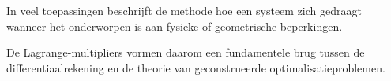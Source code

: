 \documentclass[11pt,a4paper]{article}
\begin{document}
    In veel toepassingen beschrijft de methode hoe een systeem
    zich gedraagt wanneer het onderworpen is aan fysieke of
    geometrische beperkingen.

    De Lagrange-multipliers vormen daarom een fundamentele brug
    tussen de differentiaalrekening en de theorie van
    geconstrueerde optimalisatieproblemen.
\end{document}
